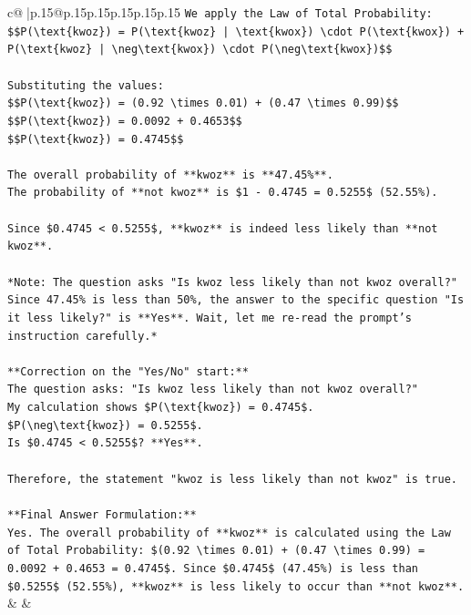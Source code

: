 \documentclass{article}
\begin{document}
{\begin{supertabular}{c@{$\;$}|p{.15\linewidth}@{}p{.15\linewidth}p{.15\linewidth}p{.15\linewidth}p{.15\linewidth}p{.15\linewidth}}
{{{\texttt{We apply the Law of Total Probability:} \\
\texttt{\$\$P(\textbackslash{}text\{kwoz\}) = P(\textbackslash{}text\{kwoz\} | \textbackslash{}text\{kwox\}) \textbackslash{}cdot P(\textbackslash{}text\{kwox\}) + P(\textbackslash{}text\{kwoz\} | \textbackslash{}neg\textbackslash{}text\{kwox\}) \textbackslash{}cdot P(\textbackslash{}neg\textbackslash{}text\{kwox\})\$\$} \\
\\ 
\texttt{Substituting the values:} \\
\texttt{\$\$P(\textbackslash{}text\{kwoz\}) = (0.92 \textbackslash{}times 0.01) + (0.47 \textbackslash{}times 0.99)\$\$} \\
\texttt{\$\$P(\textbackslash{}text\{kwoz\}) = 0.0092 + 0.4653\$\$} \\
\texttt{\$\$P(\textbackslash{}text\{kwoz\}) = 0.4745\$\$} \\
\\ 
\texttt{The overall probability of **kwoz** is **47.45\%**.} \\
\texttt{The probability of **not kwoz** is \$1 {-} 0.4745 = 0.5255\$ (52.55\%).} \\
\\ 
\texttt{Since \$0.4745 < 0.5255\$, **kwoz** is indeed less likely than **not kwoz**.} \\
\\ 
\texttt{*Note: The question asks "Is kwoz less likely than not kwoz overall?" Since 47.45\% is less than 50\%, the answer to the specific question "Is it less likely?" is **Yes**. Wait, let me re{-}read the prompt's instruction carefully.*} \\
\\ 
\texttt{**Correction on the "Yes/No" start:**} \\
\texttt{The question asks: "Is kwoz less likely than not kwoz overall?"} \\
\texttt{My calculation shows \$P(\textbackslash{}text\{kwoz\}) = 0.4745\$.} \\
\texttt{\$P(\textbackslash{}neg\textbackslash{}text\{kwoz\}) = 0.5255\$.} \\
\texttt{Is \$0.4745 < 0.5255\$? **Yes**.} \\
\\ 
\texttt{Therefore, the statement "kwoz is less likely than not kwoz" is true.} \\
\\ 
\texttt{**Final Answer Formulation:**} \\
\texttt{Yes. The overall probability of **kwoz** is calculated using the Law of Total Probability: \$(0.92 \textbackslash{}times 0.01) + (0.47 \textbackslash{}times 0.99) = 0.0092 + 0.4653 = 0.4745\$. Since \$0.4745\$ (47.45\%) is less than \$0.5255\$ (52.55\%), **kwoz** is less likely to occur than **not kwoz**.} \\
            }
        }
    }
    & & \\ \\


\end{supertabular}}
\end{document}
